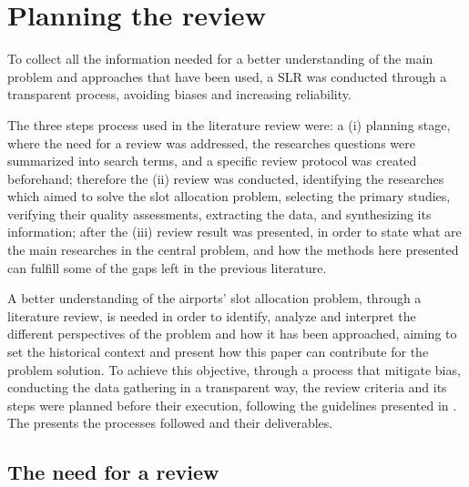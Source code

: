 \section{Planning the review}
\label{section:Planning}

To collect all the information needed for a better understanding of the main problem and approaches that have been used, a \acrfull{SLR} was conducted through a transparent process, avoiding biases and increasing reliability.

The three steps process used in the literature review were: a (i) planning stage, where the need for a review was addressed, the researches questions were summarized into search terms, and a specific review protocol was created beforehand; therefore the (ii) review was conducted, identifying the researches which aimed to solve the slot allocation problem, selecting the primary studies, verifying their quality assessments, extracting the data, and synthesizing its information; after the (iii) review result was presented, in order to state what are the main researches in the central problem, and how the methods here presented can fulfill some of the gaps left in the previous literature.

A better understanding of the airports' slot allocation problem, through a literature review, is needed in order to identify, analyze and interpret the different perspectives of the problem and how it has been approached, aiming to set the historical context and present how this paper can contribute for the problem solution. To achieve this objective, through a process that mitigate bias, conducting the data gathering in a transparent way, the review criteria and its steps were planned before their execution, following the guidelines presented in \cite{wohlin2012experimentation}. The  presents the processes followed and their deliverables.

%

\subsection{The need for a review}

